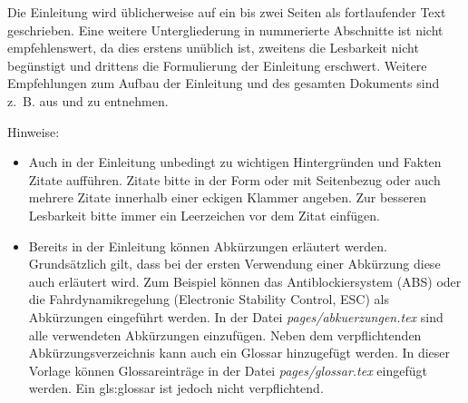 Die Einleitung wird üblicherweise auf ein bis zwei Seiten als fortlaufender Text geschrieben. Eine weitere Untergliederung in nummerierte Abschnitte ist nicht empfehlenswert, da dies erstens unüblich ist, zweitens die Lesbarkeit nicht begünstigt und drittens die Formulierung der Einleitung erschwert. Weitere Empfehlungen zum Aufbau der Einleitung und des gesamten Dokuments sind z.~B. aus \autocite{DHBW.2021} und \autocite{Lindenlauf.2022} zu entnehmen.

\clearpage

Hinweise: 

\begin{itemize}
\item Auch in der Einleitung unbedingt zu wichtigen Hintergründen und Fakten Zitate aufführen. Zitate bitte in der Form \autocite{Tipler.2019} oder mit Seitenbezug \autocite[66]{Ziegler.2017} oder auch mehrere Zitate  \autocite{Tipler.2019, Ziegler.2017} innerhalb einer eckigen Klammer angeben. Zur besseren Lesbarkeit bitte immer ein Leerzeichen vor dem Zitat einfügen.
	
\item Bereits in der Einleitung können Abkürzungen erläutert werden. Grundsätzlich gilt, dass bei der ersten Verwendung einer Abkürzung diese auch erläutert wird. Zum Beispiel können das Antiblockiersystem (ABS) oder die Fahrdynamikregelung (Electronic Stability Control, ESC) als Abkürzungen eingeführt werden. In der Datei \textit{pages/abkuerzungen.tex} sind alle verwendeten Abkürzungen einzufügen. Neben dem verpflichtenden Abkürzungsverzeichnis kann auch ein Glossar hinzugefügt werden. In dieser Vorlage können Glossareinträge in der Datei \textit{pages/glossar.tex} eingefügt werden. Ein \Gls{gls:glossar} ist jedoch nicht verpflichtend.
\end{itemize}